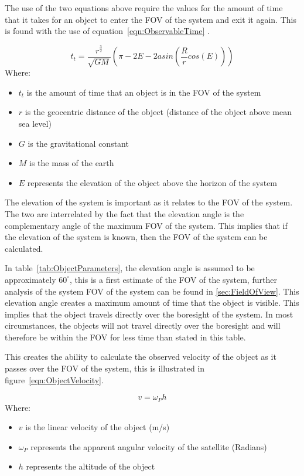 \documentclass[11pt]{witseiepaper}
\begin{document}
The use of the two equations above require the values for the amount of time that it takes for an object to enter the FOV of the system and exit it again. This is found with the use of equation~\ref{eqn:ObservableTime} \cite{ObservableTime}.

\begin{equation} \label{eqn:ObservableTime}
    t_{t} = \frac{r^{\frac{3}{2}}}{\sqrt{GM}} (\pi - 2E - 2 asin(\frac{R}{r} cos(E)))
\end{equation}
Where:
\begin{itemize}
    \item $t_{t}$ is the amount of time that an object is in the FOV of the system
    \item $r$ is the geocentric distance of the object (distance of the object above mean sea level)
    \item $G$ is the gravitational constant
    \item $M$ is the mass of the earth
    \item $E$ represents the elevation of the object above the horizon of the system
\end{itemize}

The elevation of the system is important as it relates to the FOV of the system. The two are interrelated by the fact that the elevation angle is the complementary angle of the maximum FOV of the system. This implies that if the elevation of the system is known, then the FOV of the system can be calculated.

In table~\ref{tab:ObjectParameters}, the elevation angle is assumed to be approximately $60^{\circ}$, this is a first estimate of the FOV of the system, further analysis of the system FOV of the system can be found in \ref{sec:FieldOfView}. This elevation angle creates a maximum amount of time that the object is visible. This implies that the object travels directly over the boresight of the system. In most circumstances, the objects will not travel directly over the boresight and will therefore be within the FOV for less time than stated in this table.

This creates the ability to calculate the observed velocity of the object as it passes over the FOV of the system, this is illustrated in figure~\ref{eqn:ObjectVelocity}.

\begin{equation} \label{eqn:ObjectVelocity}
    v = \omega_{P} h
\end{equation}
Where:
\begin{itemize}
    \item $v$ is the linear velocity of the object (m/s)
    \item $\omega_{P}$ represents the apparent angular velocity of the satellite (Radians)
    \item $h$ represents the altitude of the object
\end{itemize}
\end{document}
